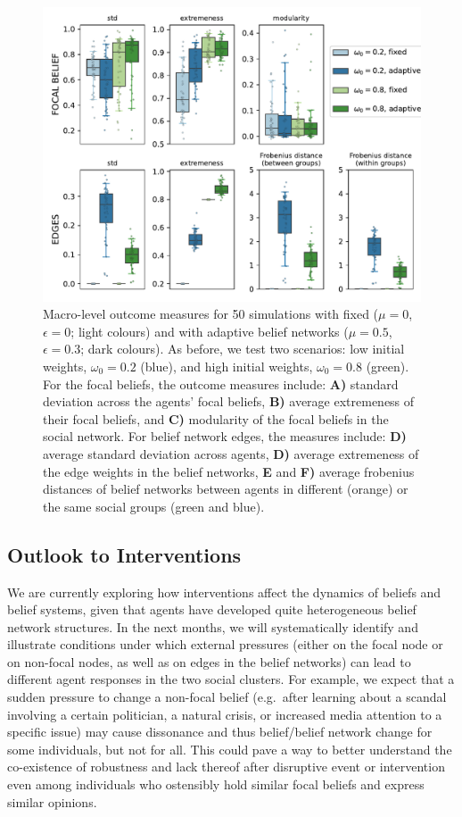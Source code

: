 \begin{figure}[t]
    \centering
    \includegraphics[width=0.8\linewidth]{figures/outcomes.pdf}
    \caption{Macro-level outcome measures for 50 simulations with fixed ($\mu=0$, $\epsilon=0$; light colours) and with adaptive belief networks ($\mu=0.5$, $\epsilon=0.3$; dark colours). As before, we test two scenarios: low initial weights, $\omega_0=0.2$ (blue), and high initial weights, $\omega_0=0.8$ (green). For the focal beliefs, the outcome measures include: \textbf{A)} standard deviation across the agents' focal beliefs, \textbf{B)} average extremeness of their focal beliefs, and \textbf{C)} modularity of the focal beliefs in the social network. For belief network edges, the measures include: \textbf{D)} average standard deviation across agents, \textbf{D)} average extremeness of the edge weights in the belief networks, \textbf{E} and \textbf{F)} average frobenius distances of belief networks between agents in different (orange) or the same social groups (green and blue).}
    \label{fig:outcomes}
\end{figure}

\subsection*{Outlook to Interventions}

We are currently exploring how interventions affect the dynamics of beliefs and belief systems, given that agents have developed quite heterogeneous belief network structures. In the next months, we will systematically identify and illustrate conditions under which external pressures (either on the focal node or on non-focal nodes, as well as on edges in the belief networks) can lead to different agent responses in the two social clusters. For example, we expect that a sudden pressure to change a non-focal belief (e.g.~after learning about a scandal involving a certain politician, a natural crisis, or increased media attention to a specific issue) may cause dissonance and thus belief/belief network change for some individuals, but not for all. This could pave a way to better understand the co-existence of robustness and lack thereof after disruptive event or intervention even among individuals who ostensibly hold similar focal beliefs and express similar opinions.   

